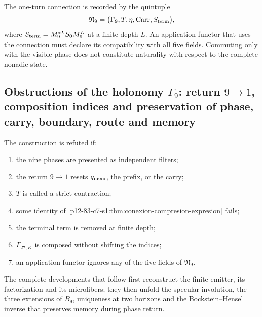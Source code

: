 The one-turn connection is recorded by the quintuple
\[
 \mathfrak N_9=
 \bigl(\Gamma_9,T,\eta,\operatorname{Carr},S_{\rm term}\bigr),
\]
where \(S_{\rm term}=M_9^{*L}S_0M_9^L\) at a finite depth
\(L\). An application functor that uses the connection must declare its
compatibility with all five fields. Commuting only with the visible phase does not
constitute naturality with respect to the complete nonadic state.

\subsection{Obstructions of the holonomy \(\Gamma_9\): return \(9\to1\), composition indices and preservation of phase, carry, boundary, route and memory}

\begin{criterion}
The construction is refuted if:
\begin{enumerate}
 \item the nine phases are presented as independent filters;
 \item the return \(9\to1\) resets \(q_{\rm mem}\), the prefix, or the carry;
 \item \(T\) is called a strict contraction;
 \item some identity of
       \cref{p12-83-c7-s1:thm:conexion-compresion-expresion} fails;
 \item the terminal term is removed at finite depth;
 \item \(\Gamma_{27,K}\) is composed without shifting the indices;
 \item an application functor ignores any of the five fields of
       \(\mathfrak N_9\).
\end{enumerate}
\end{criterion}

The complete developments that follow first reconstruct the finite emitter,
its factorization and its microfibers; they then unfold the specular involution,
the three extensions of \(B_9\), uniqueness at two horizons and the
Bockstein--Hensel inverse that preserves memory during phase return.

\begin{HMTScientificOwnerSubordinated}

\end{HMTScientificOwnerSubordinated}

\begin{HMTScientificOwnerSubordinated}

\end{HMTScientificOwnerSubordinated}
